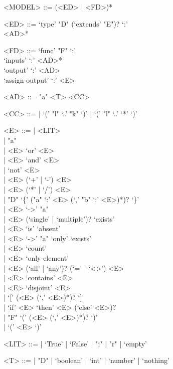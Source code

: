 \begin{grammar}
<MODEL> ::= 
  (<ED> | <FD>)*

<ED> ::= 
  `type' "D" (`extends' "E")? `:'\\
\ind <AD>*

<FD> ::= 
  `func' "F" `:'\\
\ind `inputs' `:' <AD>*\\
\ind `output' `:' <AD>\\
\ind `assign-output' `:' <E>

<AD> ::= 
  "a" <T> <CC>

<CC> ::= 
  | `(' "l" `..' "k" `)' 
  | `(' "l" `..' `*' `)' 

<E> ::= 
  | <LIT>\\
  | "a"\\
  | <E> `or' <E>\\
  | <E> `and' <E>\\
  | `not' <E>\\
  | <E> (`+' | `-') <E>\\
  | <E> (`*' | `/') <E>\\
  | "D" `\{' ("a" `:' <E> (`,' "b" `:' <E>)*)? `\}'\\
  | <E> `->' "a"\\
  | <E> (`single' | `multiple')? `exists'\\
  | <E> `is' `absent'\\
  | <E> `->' "a" `only' `exists'\\
  | <E> `count'\\
  | <E> `only-element'\\
  | <E> (`all' | `any')? (`=' | `<>') <E>\\
  | <E> `contains' <E>\\
  | <E> `disjoint' <E>\\
  | `[' (<E> (`,' <E>)*)? `]'\\
  | `if' <E> `then' <E> (`else' <E>)?\\
  | "F" `(' (<E> (`,' <E>)*)? `)'\\
  | `(' <E> `)'

<LIT> ::= 
  | `True' | `False' 
  | "i" 
  | "r" 
  | `empty' 

<T> ::= 
  | "D"
  | `boolean'
  | `int'
  | `number'
  | `nothing'
\end{grammar}
